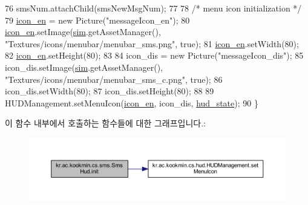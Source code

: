 \begin{DoxyCode}
76     smsNum.attachChild(smsNewMsgNum);
77 
78     \textcolor{comment}{/* menu icon initialization */}
79     \hyperlink{classkr_1_1ac_1_1kookmin_1_1cs_1_1sms_1_1_sms_hud_a193c97d71fca49a82a8f4e9ba0fc7d5a}{icon\_en} = \textcolor{keyword}{new} Picture(\textcolor{stringliteral}{"messageIcon\_en"});
80     \hyperlink{classkr_1_1ac_1_1kookmin_1_1cs_1_1sms_1_1_sms_hud_a193c97d71fca49a82a8f4e9ba0fc7d5a}{icon\_en}.setImage(\hyperlink{classkr_1_1ac_1_1kookmin_1_1cs_1_1sms_1_1_sms_hud_af6e0bca70fb93df48b91fa40cf202ec0}{sim}.getAssetManager(), \textcolor{stringliteral}{"Textures/icons/menubar/menubar\_sms.png"}, \textcolor{keyword}{true});
81     \hyperlink{classkr_1_1ac_1_1kookmin_1_1cs_1_1sms_1_1_sms_hud_a193c97d71fca49a82a8f4e9ba0fc7d5a}{icon\_en}.setWidth(80);
82     \hyperlink{classkr_1_1ac_1_1kookmin_1_1cs_1_1sms_1_1_sms_hud_a193c97d71fca49a82a8f4e9ba0fc7d5a}{icon\_en}.setHeight(80);
83 
84     icon\_dis = \textcolor{keyword}{new} Picture(\textcolor{stringliteral}{"messageIcon\_dis"});
85     icon\_dis.setImage(\hyperlink{classkr_1_1ac_1_1kookmin_1_1cs_1_1sms_1_1_sms_hud_af6e0bca70fb93df48b91fa40cf202ec0}{sim}.getAssetManager(), \textcolor{stringliteral}{"Textures/icons/menubar/menubar\_sms\_c.png"}, \textcolor{keyword}{true});
86     icon\_dis.setWidth(80);
87     icon\_dis.setHeight(80);
88 
89     HUDManagement.setMenuIcon(\hyperlink{classkr_1_1ac_1_1kookmin_1_1cs_1_1sms_1_1_sms_hud_a193c97d71fca49a82a8f4e9ba0fc7d5a}{icon\_en}, icon\_dis, \hyperlink{classkr_1_1ac_1_1kookmin_1_1cs_1_1sms_1_1_sms_hud_a7e4751ec05c3e04a3d43b617665397b8}{hud\_state});
90   \}
\end{DoxyCode}


이 함수 내부에서 호출하는 함수들에 대한 그래프입니다.\+:\nopagebreak
\begin{figure}[H]
\begin{center}
\leavevmode
\includegraphics[width=350pt]{classkr_1_1ac_1_1kookmin_1_1cs_1_1sms_1_1_sms_hud_ac31dd21aa4220865cb34708393e8d327_cgraph}
\end{center}
\end{figure}


\hypertarget{classkr_1_1ac_1_1kookmin_1_1cs_1_1sms_1_1_sms_hud_af5cfee98fa47381d2267bf9feeecab35}{}
